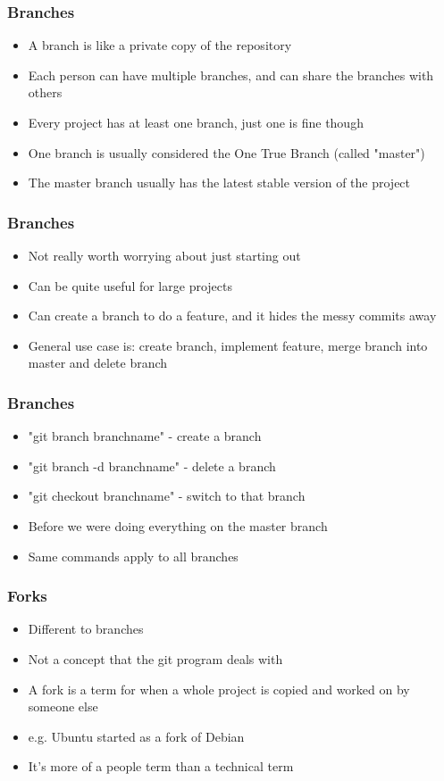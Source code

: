 \documentclass{beamer}
\begin{document}
\begin{frame}
\frametitle{Branches}
\begin{itemize}
\item A branch is like a private copy of the repository
\item Each person can have multiple branches, and can share the branches with others
\item Every project has at least one branch, just one is fine though
\item One branch is usually considered the One True Branch (called "master")
\item The master branch usually has the latest stable version of the project
\end{itemize}
\begin{figure}
\end{figure}
\end{frame}

\begin{frame}
\frametitle{Branches}
\begin{itemize}
\item Not really worth worrying about just starting out
\item Can be quite useful for large projects
\item Can create a branch to do a feature, and it hides the messy commits away
\item General use case is: create branch, implement feature, merge branch into master and delete branch
\end{itemize}
\end{frame}

\begin{frame}
\frametitle{Branches}
\begin{itemize}
\item "git branch branchname" - create a branch
\item "git branch -d branchname" - delete a branch
\item "git checkout branchname" - switch to that branch
\item Before we were doing everything on the master branch
\item Same commands apply to all branches
\end{itemize}
\begin{figure}
\end{figure}
\end{frame}

\begin{frame}
\frametitle{Forks}
\begin{itemize}
\item Different to branches
\item Not a concept that the git program deals with
\item A fork is a term for when a whole project is copied and worked on by someone else
\item e.g. Ubuntu started as a fork of Debian
\item It's more of a people term than a technical term
\end{itemize}
\begin{figure}
\end{figure}
\end{frame}
\end{document}
